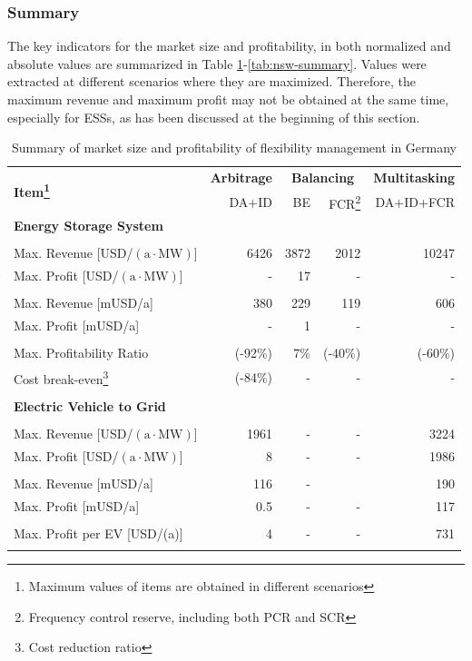 \subsubsection{Summary}

The key indicators for the market size and profitability, in both normalized and absolute values are summarized in Table \ref{tab:germany-summary}-\ref{tab:nsw-summary}. Values were extracted at different scenarios where they are maximized. Therefore, the maximum revenue and maximum profit may not be obtained at the same time, especially for ESSs, as has been discussed at the beginning of this section.

\begin{table}
	\centering
	\begin{tabular}{l r r r r}
		\hline
		\multirow{2}{*}{\textbf{Item\footnote{Maximum values of items are obtained in different scenarios}}}& \textbf{Arbitrage} & \multicolumn{2}{c}{\textbf{Balancing}} & \textbf{Multitasking} \\
		\multirow{2}{*}{}& DA+ID & BE & FCR\footnote{Frequency control reserve, including both PCR and SCR} & DA+ID+FCR \\
		\hline
		\multicolumn{5}{l}{\textbf{Energy Storage System}} \\
		& & & & \\
		Max. Revenue [USD/$(\text{a} \cdot \text{MW})$] & \num{6426} & \num{3872} & \num{2012} & \num{10247} \\
		Max. Profit [USD/$(\text{a} \cdot \text{MW})$] & - & 17 & - & - \\
		& & & & \\
		Max. Revenue [mUSD/a] & \num{380} & \num{229} & \num{119} & \num{606} \\
		Max. Profit [mUSD/a] & - & 1 & - & - \\
		& & & & \\
		Max. Profitability Ratio & (-92\%) & 7\% & (-40\%) & (-60\%) \\
		Cost break-even\footnote{Cost reduction ratio} & (-84\%) & - &- & -\\
		& & & &\\
		\hline
		\multicolumn{5}{l}{\textbf{Electric Vehicle to Grid}} \\
		& & & & \\
		Max. Revenue [USD/$(\text{a} \cdot \text{MW})$] & \num{1961} & - & - & \num{3224} \\
		Max. Profit [USD/$(\text{a} \cdot \text{MW})$] & 8 & - & - & \num{1986} \\
		& & & & \\
		Max. Revenue [mUSD/a] & \num{116} & - & \- & \num{190} \\
		Max. Profit [mUSD/a] & \num{0.5} & - & - & 117 \\
		& & & & \\
		Max. Profit per EV [USD/(a)] & \num{4} & - & - & \num{731} \\
		& & & &\\
		\hline
	\end{tabular}
	\caption{Summary of market size and profitability of flexibility management in Germany}\label{tab:germany-summary}
\end{table}

